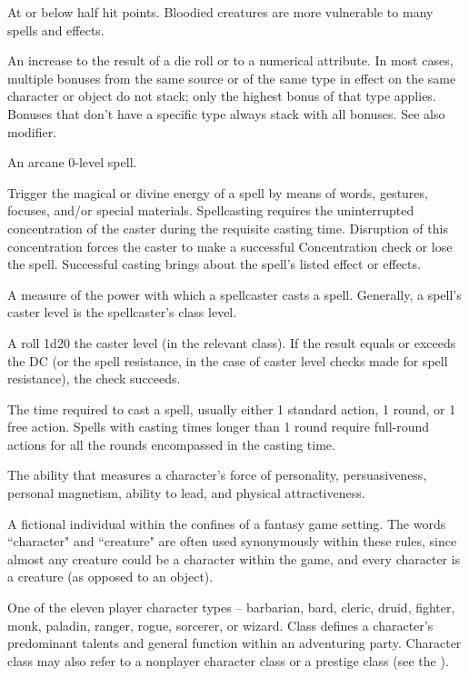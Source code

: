  At or below half hit points. Bloodied creatures are more vulnerable to many spells and effects.

 An increase to the result of a die roll or to a numerical attribute. In most cases, 
multiple bonuses from the same 
source or of the same type in 
effect on the same character or 
object do not stack; only the highest 
bonus of that type applies. Bonuses 
that don't have a specific type always 
stack with all bonuses. See also modifier.

 An arcane 0-level spell. 

 Trigger the magical or divine energy 
of a spell by means of words, gestures, focuses, and/or 
special materials. Spellcasting requires the uninterrupted 
concentration of the caster during the requisite casting 
time. Disruption of this concentration forces the caster to make a 
successful Concentration check or lose the spell. Successful casting 
brings about the spell's listed effect or effects. 

 A measure of the power with which a spellcaster 
casts a spell. Generally, a spell's caster level is the spellcaster's class 
level. 

 A roll 1d20 \add the caster level (in the relevant 
class). If the result equals or exceeds the DC (or the spell resistance, 
in the case of caster level checks made for spell resistance), the 
check succeeds. 

 The time required to cast a spell, usually either 1 
standard action, 1 round, or 1 free action. Spells with casting times 
longer than 1 round require full-round actions for all the rounds 
encompassed in the casting time. 

 The ability that measures a character's force of 
personality, persuasiveness, personal magnetism, ability to lead, and 
physical attractiveness. 

 A fictional individual within the confines of a fantasy 
game setting. The words ``character" and ``creature" are often used 
synonymously within these rules, since almost any creature could 
be a character within the game, and every character is a creature (as 
opposed to an object). 

 One of the eleven player character types --
barbarian, bard, cleric, druid, fighter, monk, paladin, ranger, rogue, 
sorcerer, or wizard. Class defines a character's predominant talents 
and general function within an adventuring party. Character class 
may also refer to a nonplayer character class or a prestige class (see 
the ). 


